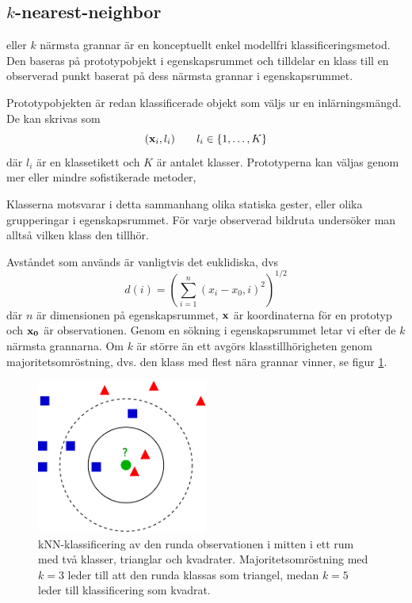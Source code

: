 \documentclass[../rapport_MVEX01-11-05]{subfiles}
\begin{document}
\subsection{$k$-nearest-neighbor}\label{sec:knn}

\knn eller $k$ närmsta grannar är en konceptuellt enkel modellfri
klassificeringsmetod.
Den baseras på prototypobjekt i egenskapsrummet och tilldelar en klass
till en observerad punkt baserat på dess närmsta grannar i egenskapsrummet.

Prototypobjekten är redan klassificerade objekt som väljs ur en inlärningsmängd.
De kan skrivas som
\begin{equation*}
    (\mathbf{x}_i, l_i)\qquad l_i \in \{ 1,\dotsc,K \}
\end{equation*}
där $l_i$ är en klassetikett och $K$ är antalet klasser.
Prototyperna kan väljas genom mer eller mindre sofistikerade metoder,


Klasserna motsvarar i detta sammanhang olika statiska gester,
eller olika grupperingar i egenskapsrummet. För
varje observerad bildruta undersöker man alltså vilken klass den tillhör.

Avståndet som används är vanligtvis det euklidiska, dvs
\begin{equation*}
    d(i) = \left(\sum_{i=1}^n(x_i-x_0,i)^2\right)^{1/2}
\end{equation*}
där $n$ är dimensionen på egenskapsrummet, $\mathbf{x}$ är koordinaterna för en
prototyp och $\mathbf{x_0}$ är observationen. Genom en sökning i
egenskapsrummet letar vi efter de $k$ närmsta grannarna. Om $k$ är större än ett
avgörs klasstillhörigheten genom majoritetsomröstning, dvs. den klass med flest
nära grannar vinner, se figur \ref{fig:knn-overview}.

\begin{figure}[!htb]
    \begin{center}
\includegraphics[width=0.5\textwidth]{bilder/KnnClassification}
    \end{center}
    \caption{kNN-klassificering av den runda observationen i mitten i ett rum
    med två klasser, trianglar och kvadrater. Majoritetsomröstning
    med $k=3$ leder till att den runda klassas som triangel, medan $k=5$ leder
    till klassificering som kvadrat.}
    \label{fig:knn-overview}
\end{figure}
\end{document}
